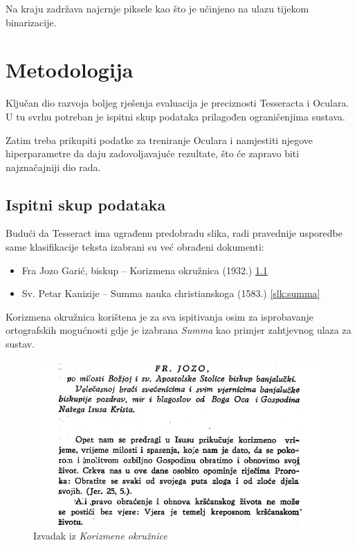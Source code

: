 \documentclass[zavrsnirad]{fer}
\begin{document}
Na kraju zadržava najcrnje piksele kao što je učinjeno na ulazu tijekom binarizacije.








\chapter{Metodologija}
\label{pog:metodologija}

Ključan dio razvoja boljeg rješenja evaluacija je preciznosti Tesseracta i Oculara. U tu svrhu potreban je ispitni skup podataka prilagođen ograničenjima sustava. 

Zatim treba prikupiti podatke za treniranje Oculara i namjestiti njegove hiperparametre da daju zadovoljavajuće rezultate, što će zapravo biti najznačajniji dio rada.


\section{Ispitni skup podataka}

Budući da Tesseract ima ugrađenu predobradu slika, radi pravednije usporedbe same klasifikacije teksta izabrani su već obrađeni dokumenti:

\begin{itemize}
	\item Fra Jozo Garić, biskup – Korizmena okružnica (1932.) \ref{slk:korizmena}
	\item Sv. Petar Kanizije – Summa nauka christianskoga (1583.) \ref{slk:summa}
\end{itemize}

Korizmena okružnica korištena je za sva ispitivanja osim za isprobavanje ortografskih mogućnosti gdje je izabrana \textit{Summa} kao primjer zahtjevnog ulaza za sustav.

\begin{figure}[H]
	\centering
	\includegraphics[width=1.0\linewidth]{Figures/korizmena.png} 
	\caption{Izvadak iz \textit{Korizmene okružnice}}
	\label{slk:korizmena}
\end{figure}
\end{document}
